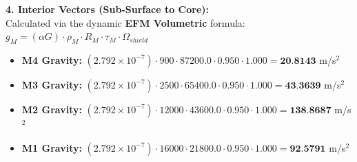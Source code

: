 \documentclass[11pt, a4paper]{article}
\begin{document}
  \vspace{0.5em}
  \noindent \textbf{4. Interior Vectors (Sub-Surface to Core):} \\[0.5em]
  \hspace*{1em} Calculated via the dynamic \textbf{EFM Volumetric} formula: $g_M = (\alpha G) \cdot \rho_{M} \cdot R_M \cdot \tau_M \cdot \Omega_{shield}$
  \begin{itemize}
    \item \textbf{M4 Gravity:} $(2.792 \times 10^{-7}) \cdot 900 \cdot 87200.0 \cdot 0.950 \cdot 1.000 = \textbf{20.8143}$ m/s$^2$
    \item \textbf{M3 Gravity:} $(2.792 \times 10^{-7}) \cdot 2500 \cdot 65400.0 \cdot 0.950 \cdot 1.000 = \textbf{43.3639}$ m/s$^2$
    \item \textbf{M2 Gravity:} $(2.792 \times 10^{-7}) \cdot 12000 \cdot 43600.0 \cdot 0.950 \cdot 1.000 = \textbf{138.8687}$ m/s$^2$
    \item \textbf{M1 Gravity:} $(2.792 \times 10^{-7}) \cdot 16000 \cdot 21800.0 \cdot 0.950 \cdot 1.000 = \textbf{92.5791}$ m/s$^2$
  \end{itemize}
\end{document}
